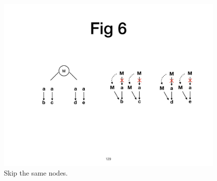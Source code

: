 \documentclass{ctexart}
\newcommand{\para}[1]{\noindent {\bf #1}}%
\begin{document}

\begin{figure}[!htbp]
\centering
      \centering\includegraphics[width=\linewidth]{figures/ss-129.pdf}
\caption{\small Skip the same nodes.}
\label{fig:skip}
\end{figure}
\end{document}
